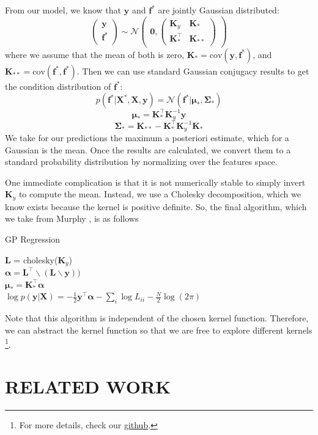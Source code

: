 \documentclass[letterpaper, 11 pt, conference]{ieeeconf}  %
\newcommand{\by}{\textbf{y}}
\newcommand{\bX}{\textbf{X}}
\newcommand{\bK}{\textbf{K}}
\newcommand{\cov}{\text{cov}}
\begin{document}
From our model, we know that $\textbf{y}$ and $\textbf{f}^*$ are jointly Gaussian distributed:
$$\begin{pmatrix}
\by \\ \textbf{f}^*
\end{pmatrix} \sim \mathcal{N}\begin{pmatrix}
\textbf{0}, \begin{pmatrix}
\bK_y & \bK_* \\
\bK_*^\top & \bK_{**}
\end{pmatrix}
\end{pmatrix}
$$
where we assume that the mean of both is zero, $\bK_* = \cov(\by, \textbf{f}^*)$, and $\bK_{**} = \cov(\textbf{f}^*, \textbf{f}^*)$. Then we can use standard Gaussian conjugacy results to get the condition distribution of $\textbf{f}^*$:
$$p(\textbf{f}^*|\bX^*,\bX, \by) = \mathcal{N}(\textbf{f}^*|\bm{\mu}_*, \bm{\Sigma}_*)$$
$$\bm{\mu}_* = \bK_*^\top \bK_y^{-1} \by$$
$$\bm{\Sigma}_* = \bK_{**} - \bK_*^\top \bK_y^{-1} \bK_*$$
We take for our predictions the maximum a posteriori estimate, which for a Gaussian is the mean. Once the results are calculated, we convert them to a standard probability distribution by normalizing over the features space. 

One immediate complication is that it is not numerically stable to simply invert $\bK_y$ to compute the mean. Instead, we use a Cholesky decomposition, which we know exists because the kernel is positive definite. So, the final algorithm, which we take from Murphy \cite{c2}, is as follows
\LinesNumbered
\begin{algorithm}[ht]
  \caption{GP Regression\label{alg}}
  \textbf{L} = cholesky($\bK_y$) \\
  $\bm{\alpha} = \textbf{L}^\top \backslash (\textbf{L} \backslash \by))$ \\
  $\bm{\mu_*} = \bK_*^\top\bm{\alpha} $ \\
  $\log p(\by | \bX) = -\frac{1}{2}\by^\top \bm{\alpha} - \sum_i \log L_{ii} - \frac{N}{2}\log(2\pi)$
\end{algorithm}

Note that this algorithm is independent of the chosen kernel function. Therefore, we can abstract the kernel function so that we are free to explore different kernels \footnote{For more details, check our \href{https://github.com/kandluis/crime-prediction}{github}.}. 

\section{RELATED WORK}
\end{document}
